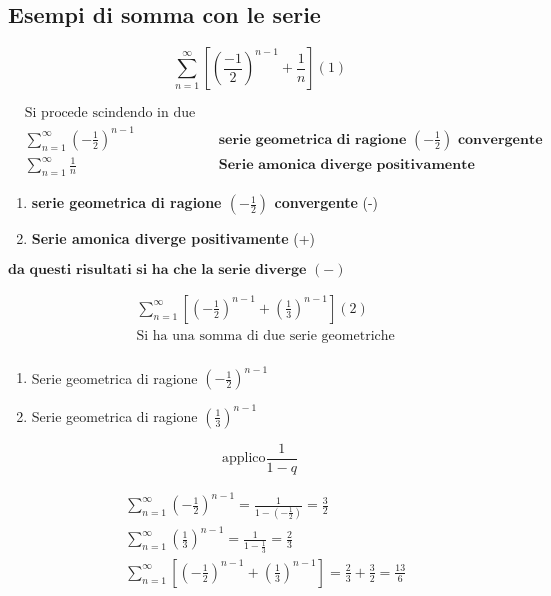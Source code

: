 \documentclass{article}
\begin{document}
\subsection*{Esempi di somma con le serie}
\[
    \sum_{n=1}^{\infty} \left[\left( \frac{-1}{2}\right)^{n-1} + \frac{1}{n}\right] (1)
\]

\begin{align*}
        &\text{Si procede scindendo in due la serie} \\
        &\sum_{n=1}^{\infty} \left(-\frac{1}{2} \right)^{n-1}  &\textbf{serie geometrica di ragione $\left( -\frac{1}{2}\right)$ convergente}\\  
        &\sum_{n=1}^{\infty} \frac{1}{n} &\textbf{Serie amonica diverge positivamente} 
\end{align*}
    
\begin{enumerate}
        \item \textbf{serie geometrica di ragione $\left( -\frac{1}{2}\right)$ convergente} (-)
        \item \textbf{Serie amonica diverge positivamente} (+)
\end{enumerate}
    $\textbf{da questi risultati si ha che la serie diverge }(-)$

\begin{align*}
        &\sum_{n=1}^{\infty} \left[\left( -\frac{1}{2}\right)^{n-1} + \left (\frac{1}{3}\right )^{n-1} \right] (2) \\
        &\text{Si ha una somma di due serie geometriche} \\
\end{align*}

    
    
\begin{enumerate}
        \item Serie geometrica di ragione $\left(-\frac{1}{2}\right)^{n-1}$
        \item Serie geometrica di ragione $\left(\frac{1}{3}\right)^{n-1}$
\end{enumerate}
    \[
        \text{applico} \frac{1}{1-q}
    \]

   \begin{align*}
        &\sum_{n=1}^{\infty} \left( -\frac{1}{2} \right)^{n-1}  = \frac{1}{1 - \left(-\frac{1}{2}\right)} =  \frac{3}{2} \\
        &\sum_{n=1}^{\infty} \left( \frac{1}{3} \right)^{n-1}  = \frac{1}{1 - \frac{1}{3}} = \frac{2}{3} \\
        &\sum_{n=1}^{\infty} \left[\left( -\frac{1}{2}\right)^{n-1} + \left (\frac{1}{3}\right )^{n-1} \right] = \frac{2}{3}+\frac{3}{2} = \frac{13}{6} \\
    \end{align*}
\end{document}
